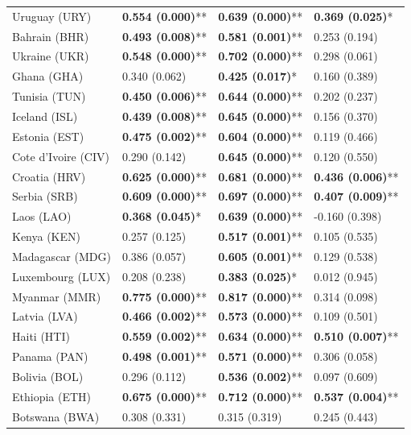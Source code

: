 \begin{longtable}{p{4cm}p{3cm}p{3cm}p{3cm}}
Uruguay (URY) & \textbf{0.554 (0.000)}** & \textbf{0.639 (0.000)}** & \textbf{0.369 (0.025)}* \\
Bahrain (BHR) & \textbf{0.493 (0.008)}** & \textbf{0.581 (0.001)}** & 0.253 (0.194) \\
Ukraine (UKR) & \textbf{0.548 (0.000)}** & \textbf{0.702 (0.000)}** & 0.298 (0.061) \\
Ghana (GHA) & 0.340 (0.062) & \textbf{0.425 (0.017)}* & 0.160 (0.389) \\
Tunisia (TUN) & \textbf{0.450 (0.006)}** & \textbf{0.644 (0.000)}** & 0.202 (0.237) \\
Iceland (ISL) & \textbf{0.439 (0.008)}** & \textbf{0.645 (0.000)}** & 0.156 (0.370) \\
Estonia (EST) & \textbf{0.475 (0.002)}** & \textbf{0.604 (0.000)}** & 0.119 (0.466) \\
Cote d'Ivoire (CIV) & 0.290 (0.142) & \textbf{0.645 (0.000)}** & 0.120 (0.550) \\
Croatia (HRV) & \textbf{0.625 (0.000)}** & \textbf{0.681 (0.000)}** & \textbf{0.436 (0.006)}** \\
Serbia (SRB) & \textbf{0.609 (0.000)}** & \textbf{0.697 (0.000)}** & \textbf{0.407 (0.009)}** \\
Laos (LAO) & \textbf{0.368 (0.045)}* & \textbf{0.639 (0.000)}** & -0.160 (0.398) \\
Kenya (KEN) & 0.257 (0.125) & \textbf{0.517 (0.001)}** & 0.105 (0.535) \\
Madagascar (MDG) & 0.386 (0.057) & \textbf{0.605 (0.001)}** & 0.129 (0.538) \\
Luxembourg (LUX) & 0.208 (0.238) & \textbf{0.383 (0.025)}* & 0.012 (0.945) \\
Myanmar (MMR) & \textbf{0.775 (0.000)}** & \textbf{0.817 (0.000)}** & 0.314 (0.098) \\
Latvia (LVA) & \textbf{0.466 (0.002)}** & \textbf{0.573 (0.000)}** & 0.109 (0.501) \\
Haiti (HTI) & \textbf{0.559 (0.002)}** & \textbf{0.634 (0.000)}** & \textbf{0.510 (0.007)}** \\
Panama (PAN) & \textbf{0.498 (0.001)}** & \textbf{0.571 (0.000)}** & 0.306 (0.058) \\
Bolivia (BOL) & 0.296 (0.112) & \textbf{0.536 (0.002)}** & 0.097 (0.609) \\
Ethiopia (ETH) & \textbf{0.675 (0.000)}** & \textbf{0.712 (0.000)}** & \textbf{0.537 (0.004)}** \\
Botswana (BWA) & 0.308 (0.331) & 0.315 (0.319) & 0.245 (0.443) \\

\end{longtable}
